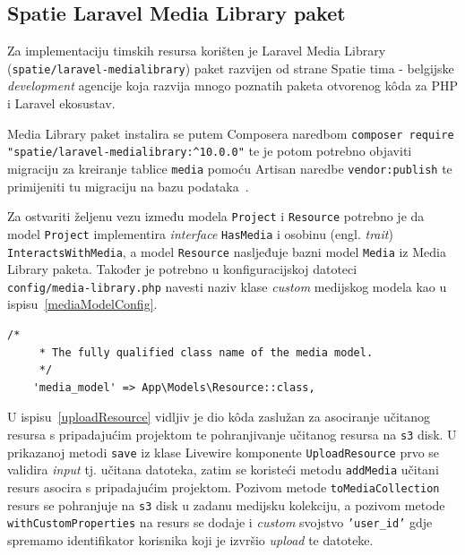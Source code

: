 \subsection{Spatie Laravel Media Library paket}
Za implementaciju timskih resursa korišten je Laravel Media Library \\ (\texttt{spatie/laravel-medialibrary}) paket razvijen od strane Spatie tima - belgijske \textit{development} agencije koja razvija mnogo poznatih paketa otvorenog k\^oda za PHP i Laravel ekosustav.

Media Library paket instalira se putem Composera naredbom \texttt{composer require "spatie/laravel-medialibrary:\textasciicircum 10.0.0"} te je potom potrebno objaviti migraciju za kreiranje tablice \texttt{media} pomoću Artisan naredbe \texttt{vendor:publish} te primijeniti tu migraciju na bazu podataka~\cite{mediaLibrary}.

Za ostvariti željenu vezu između modela \texttt{Project} i \texttt{Resource} potrebno je da model \texttt{Project} implementira \textit{interface} \texttt{HasMedia} i osobinu (engl. \textit{trait}) \\ \texttt{InteractsWithMedia}, a model \texttt{Resource} nasljeđuje bazni model \texttt{Media} iz Media Library paketa. Također je potrebno u konfiguracijskoj datoteci \\ \texttt{config/media-library.php} navesti naziv klase \textit{custom} medijskog modela kao u ispisu~\ref{mediaModelConfig}.

\begin{lstlisting}[caption={Specificiranje naziva klase \textit{media} modela u \texttt{config/media-library.php}}, label=mediaModelConfig]
    /*
     * The fully qualified class name of the media model.
     */
    'media_model' => App\Models\Resource::class,
\end{lstlisting}

U ispisu~\ref{uploadResource} vidljiv je dio k\^oda zaslužan za asociranje učitanog resursa s pripadajućim projektom te pohranjivanje učitanog resursa na \texttt{s3} disk. U prikazanoj metodi \texttt{save} iz klase Livewire komponente \texttt{UploadResource} prvo se validira \textit{input} tj. učitana datoteka, zatim se koristeći metodu \texttt{addMedia} učitani resurs asocira s pripadajućim projektom. Pozivom metode \texttt{toMediaCollection} resurs se pohranjuje na \texttt{s3} disk u zadanu medijsku kolekciju, a pozivom metode \texttt{withCustomProperties} na resurs se dodaje i  \textit{custom} svojstvo \texttt{'user\_id'} gdje spremamo identifikator korisnika koji je izvršio \textit{upload} te datoteke.

